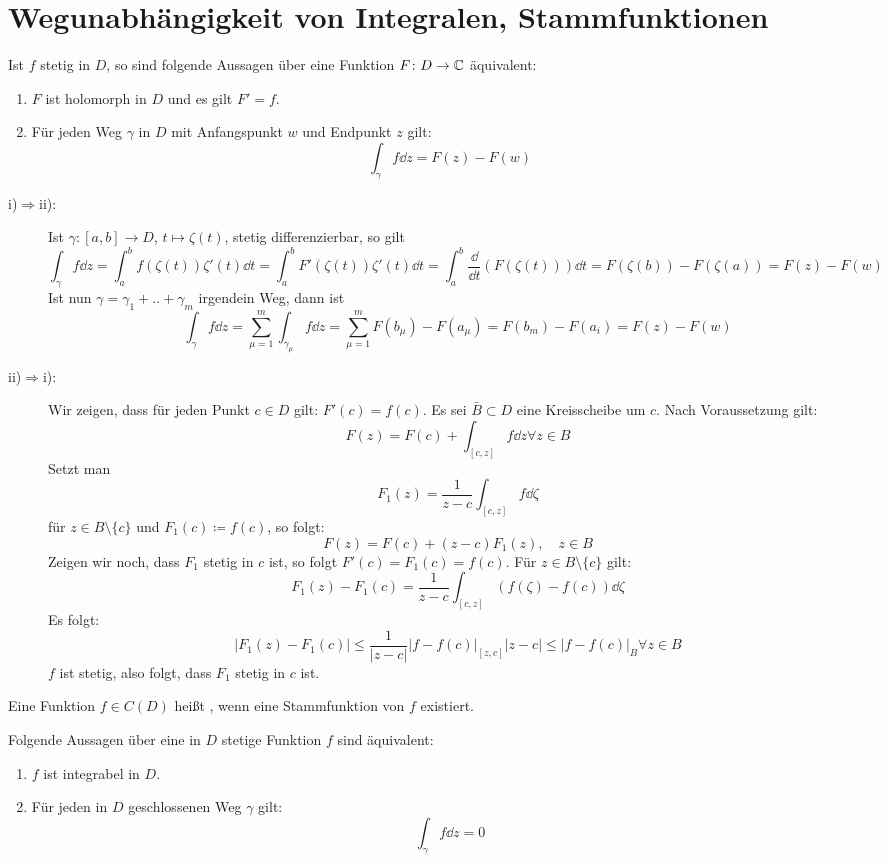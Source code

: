 \section{Wegunabh\"angigkeit von Integralen, Stammfunktionen}
\begin{satz}
	Ist $ f $ stetig in $ D $, so sind folgende Aussagen \"uber eine Funktion $ F\colon D\rightarrow\mathbb{C} $ \"aquivalent:
	\begin{enumerate}
		\item $ F $ ist holomorph in $ D $ und es gilt $ F'=f $.
		\item F\"ur jeden Weg $ \gamma $ in $ D $ mit Anfangspunkt $ w $ und Endpunkt $ z $ gilt:
		\[ \int_{\gamma}^{} f\dd z=F(z)-F(w) \]
	\end{enumerate}
\end{satz}
\newpage
\begin{beweis}
	\begin{description}
		\item[i)$ \Rightarrow $ii):] Ist $ \gamma\colon[a,b]\rightarrow D $, $ t\mapsto \zeta(t) $, stetig differenzierbar, so gilt
		\[ \int_{\gamma}^{} f\dd z=\int_a^b f(\zeta(t))\zeta'(t)\dd t=\int_a^b F'(\zeta(t))\zeta'(t)\dd t=\int_a^b\frac{\dd}{\dd t}(F(\zeta(t)))\dd t=F(\zeta(b))-F(\zeta(a))=F(z)-F(w) \]
		Ist nun $ \gamma=\gamma_1+..+\gamma_m $ irgendein Weg, dann ist
		\[ \int_{\gamma}^{} f\dd z=\sum_{\mu=1}^{m}\int_{\gamma_\mu}f\dd z=\sum_{\mu=1}^{m} F(b_\mu)-F(a_\mu)=F(b_m)-F(a_i)=F(z)-F(w) \]
		\item[ii)$ \Rightarrow $i):] Wir zeigen, dass f\"ur jeden Punkt $ c\in D $ gilt: $ F'(c)=f(c) $. Es sei $ \bar B\subset D $ eine Kreisscheibe um $ c $. Nach Voraussetzung gilt: 
		\[ F(z)=F(c)+\int_{[c,z]} f\dd z\forall z\in B \]
		Setzt man \[ F_1(z)=\frac{1}{z-c}\int_{[c,z]}f\dd\zeta \]
		f\"ur $ z\in B\setminus\lbrace c\rbrace $ und $ F_1(c)\coloneqq f(c) $, so folgt:
		\[ F(z)=F(c)+(z-c)F_1(z),\quad z\in B \]
		Zeigen wir noch, dass $ F_1 $ stetig in $ c $ ist, so folgt $ F'(c)=F_1(c)=f(c) $. F\"ur $ z\in B\setminus\lbrace c\rbrace $ gilt:
		\[ F_1(z)-F_1(c)=\frac{1}{z-c}\int_{[c,z]}^{} (f(\zeta)-f(c))\dd\zeta \]
		Es folgt:
		\[ |F_1(z)-F_1(c)|\leq\frac{1}{|z-c|}|f-f(c)|_{[z,c]}|z-c|\leq |f-f(c)|_B\forall z\in B \]
		$ f $ ist stetig, also folgt, dass $ F_1 $ stetig in $ c $ ist.
	\end{description}
\end{beweis}
Eine Funktion $ f\in C(D) $ hei\ss t , wenn eine Stammfunktion von $ f $ existiert.\\
\begin{satz}
	Folgende Aussagen \"uber eine in $ D $ stetige Funktion $ f $ sind \"aquivalent:
	\begin{enumerate}
		\item $ f $ ist integrabel in $ D $.
		\item F\"ur jeden in $ D $ geschlossenen Weg $ \gamma $ gilt:
		\[ \int_{\gamma}^{} f\dd z=0 \]
	\end{enumerate}
\end{satz}
